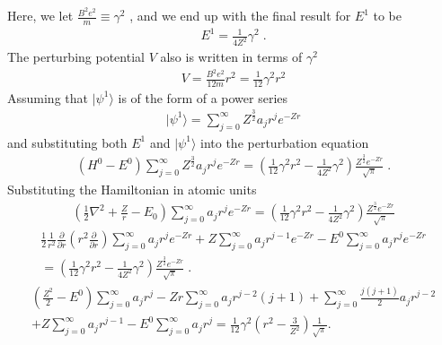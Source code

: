     \noindent Here, we let $\frac{B^2 e^2}{m} \equiv \gamma^2$ \cite{Killingbeck_1979}, and we end up with the final result for $E^1$ to be 
    \begin{align}
        E^1 = \frac{1}{4Z^2} \gamma^2\;.
    \end{align}
    \noindent The perturbing potential $V$ also is written in terms of $\gamma^2$
    \begin{align}
        V = \frac{B^2 e^2}{12m} r^2 = \frac{1}{12} \gamma^2 r^2
    \end{align}
    \noindent Assuming that $\vert \psi^1 \rangle$ is of the form of a power series 
    \begin{align}
        \vert \psi^1 \rangle = \sum_{j = 0}^\infty Z^{\frac{3}{2}} a_j r^j e^{-Zr}
    \end{align}
    \noindent and substituting both $E^1$ and $\vert \psi^1 \rangle$ into the perturbation equation
    \begin{align}
        \left(H^0 - E^0 \right) \sum_{j = 0}^\infty Z^{\frac{3}{2}} a_j r^j e^{-Zr} = \left( \frac{1}{12} \gamma^2 r^2 - \frac{1}{4Z^2} \gamma^2 \right) \frac{Z^{\frac{3}{2}} e^{-Zr}}{\sqrt{\pi}}\;.
    \end{align}
    \noindent Substituting the Hamiltonian in atomic units 
    \begin{align*}
        \left(\frac{1}{2}\nabla^2 + \frac{Z}{r} - E_0\right) \sum_{j = 0}^\infty a_j r^j e^{-Zr} = \left( \frac{1}{12} \gamma^2 r^2 - \frac{1}{4Z^2} \gamma^2 \right) \frac{Z^{\frac{3}{2}} e^{-Zr}}{\sqrt{\pi}}
    \end{align*}
    \begin{align*}
        \frac{1}{2} \frac{1}{r^2} \frac{\partial}{\partial r} \left(r^2 \frac{\partial}{\partial r} \right) \sum_{j = 0}^\infty a_j r^j e^{-Zr} + Z \sum_{j = 0}^\infty a_j r^{j - 1} e^{-Zr} - E^0 \sum_{j = 0}^\infty a_j r^j e^{-Zr} \nonumber\\ = \left( \frac{1}{12} \gamma^2 r^2 - \frac{1}{4Z^2} \gamma^2 \right) \frac{Z^{\frac{3}{2}} e^{-Zr}}{\sqrt{\pi}}\;.
    \end{align*}
    \begin{align*}
        \left( \frac{Z^2}{2} - E^0\right) \sum_{j = 0}^\infty a_j r^j - Zr \sum_{j = 0}^\infty a_j r^{j -2} (j + 1) + \sum_{j = 0}^\infty \frac{j(j+1)}{2} a_j r^{j - 2} \nonumber\\+ Z \sum_{j = 0}^\infty a_j r^{j -1} - E^0 \sum_{j = 0}^\infty a_j r^j = \frac{1}{12} \gamma^2 \left(r^2 - \frac{3}{Z^2} \right) \frac{1}{\sqrt{\pi}}.
    \end{align*}
